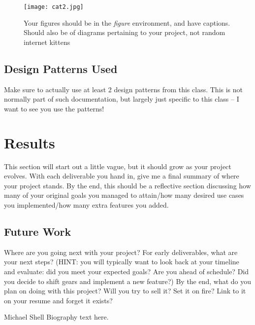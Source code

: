 \documentclass[10pt,conference,onecolumn,compsoc]{IEEEtran}
\begin{document}
\begin{figure}[ht!]
\texttt{[image: cat2.jpg]}
\caption{Your figures should be in the \emph{figure} environment, and have captions.  Should also be of diagrams pertaining to your project, not random internet kittens}
\label{cat2}
\end{figure}


\subsection{Design Patterns Used}
Make sure to actually use at least 2 design patterns from this class.  This is not normally part of such documentation, but largely just specific to this class -- I want to see you use the patterns!


\section{Results}
This section will start out a little vague, but it should grow as your project evolves.  With each deliverable you hand in, give me a final summary of where your project stands.  By the end, this should be a reflective section discussing how many of your original goals you managed to attain/how many desired use cases you implemented/how many extra features you added.

\subsection{Future Work}
Where are you going next with your project?
For early deliverables, what are your next steps?  (HINT: you will typically want to look back at your timeline and evaluate: did you meet your expected goals?  Are you ahead of schedule?  Did you decide to shift gears and implement a new feature?)
By the end, what do you plan on doing with this project?  Will you try to sell it?  Set it on fire?  Link to it on your resume and forget it exists?







\begin{IEEEbiography}{Michael Shell}
Biography text here.
\end{IEEEbiography}
\end{document}
